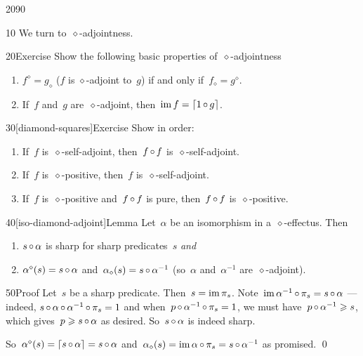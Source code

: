 \begin{parsec}{2090}%
\begin{point}{10}%
We turn to~$\diamond$-adjointness.
\end{point}
\begin{point}{20}{Exercise}%
Show the following basic properties of~$\diamond$-adjointness
\begin{enumerate}
    \item
$f^\diamond = g_\diamond$
    ($f$ is $\diamond$-adjoint to~$g$)
    if and only if~$f_\diamond = g^\diamond$.
    \item
If~$f$ and~$g$ are~$\diamond$-adjoint,
    then~$\operatorname{im} f = \left\lceil1 \mathop{\circ} g\right\rceil$.
\end{enumerate}
\end{point}
\spacingfix{}
\begin{point}{30}[diamond-squares]{Exercise}%
Show in order:
\begin{enumerate}
\item
If~$f$ is~$\diamond$-self-adjoint,
    then~$f \mathop{\circ} f$ is~$\diamond$-self-adjoint.
\item
If~$f$ is~$\diamond$-positive,
    then~$f$ is~$\diamond$-self-adjoint.
\item
If~$f$ is~$\diamond$-positive and~$f\mathop{\circ} f$ is pure,
    then~$f \mathop{\circ} f$ is~$\diamond$-positive.
\end{enumerate}
\end{point}
\spacingfix{}
\begin{point}{40}[iso-diamond-adjoint]{Lemma}%
Let~$\alpha$ be an isomorphism in a~$\diamond$-effectus.
Then
\begin{enumerate}
\item
    $s\mathop{\circ}\alpha$ is sharp for sharp predicates~$s$ \emph{and}
\item
    $\alpha^\diamond(s) = s \mathop{\circ} \alpha$
    and~$\alpha_\diamond(s) = s\mathop{\circ} \alpha^{-1}$
    (so~$\alpha$ and~$\alpha^{-1}$ are~$\diamond$-adjoint).
\end{enumerate}
\spacingfix{}
\begin{point}{50}{Proof}%
Let~$s$ be a sharp predicate. Then~$s = \operatorname{im} \pi_s$.
Note~$\operatorname{im} \alpha^{-1}\mathop{\circ} \pi_s = s \mathop{\circ} \alpha$
    --- indeed, $s \mathop{\circ} \alpha \mathop{\circ} \alpha^{-1} \mathop{\circ} \pi_s=1$
    and when~$p \mathop{\circ} \alpha^{-1} \mathop{\circ} \pi_s=1$,
    we must have~$p \mathop{\circ} \alpha^{-1} \geqslant s$,
    which gives~$p \geqslant s \mathop{\circ} \alpha$ as desired.
    So~$s \mathop{\circ} \alpha$ is indeed sharp.

So~$\alpha^\diamond(s) = \left\lceil s \mathop{\circ} \alpha\right\rceil = s\mathop{\circ} \alpha$
    and~$\alpha_\diamond(s) = \operatorname{im} \alpha \mathop{\circ} \pi_s = s \mathop{\circ} \alpha^{-1}$
    as promised. \qed
\end{point}
\end{point}
\end{parsec}

